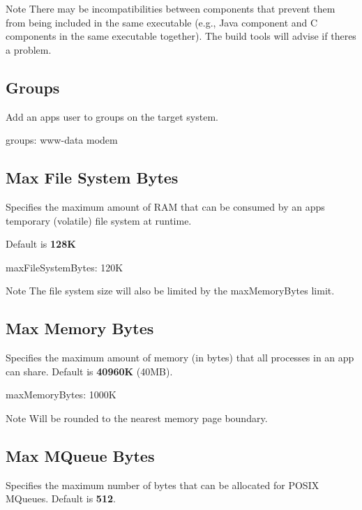 \begin{DoxyNote}{Note}
There may be incompatibilities between components that prevent them from being included in the same executable (e.\+g., Java component and C components in the same executable together). The build tools will advise if there\textquotesingle{}s a problem.
\end{DoxyNote}
\hypertarget{def_files_adef_defFilesAdef_groups}{}\subsection{Groups}\label{def_files_adef_defFilesAdef_groups}
Add an app\textquotesingle{}s user to groups on the target system.

\begin{DoxyVerb}groups:
{
    www-data
    modem
}
\end{DoxyVerb}
\hypertarget{def_files_adef_defFilesAdef_maxFileSystemBytes}{}\subsection{Max File System Bytes}\label{def_files_adef_defFilesAdef_maxFileSystemBytes}
Specifies the maximum amount of R\+A\+M that can be consumed by an app\textquotesingle{}s temporary (volatile) file system at runtime.

Default is {\bfseries 128\+K} 

\begin{DoxyVerb}maxFileSystemBytes: 120K
\end{DoxyVerb}


\begin{DoxyNote}{Note}
The file system size will also be limited by the {\ttfamily max\+Memory\+Bytes} limit.
\end{DoxyNote}
\hypertarget{def_files_adef_defFilesAdef_maxMemoryBytes}{}\subsection{Max Memory Bytes}\label{def_files_adef_defFilesAdef_maxMemoryBytes}
Specifies the maximum amount of memory (in bytes) that all processes in an app can share. Default is {\bfseries 40960\+K} (40\+M\+B).

\begin{DoxyVerb}maxMemoryBytes: 1000K
\end{DoxyVerb}


\begin{DoxyNote}{Note}
Will be rounded to the nearest memory page boundary.
\end{DoxyNote}
\hypertarget{def_files_adef_defFilesAdef_maxMQueueBytes}{}\subsection{Max M\+Queue Bytes}\label{def_files_adef_defFilesAdef_maxMQueueBytes}
Specifies the maximum number of bytes that can be allocated for P\+O\+S\+I\+X M\+Queues. Default is {\bfseries 512}.

